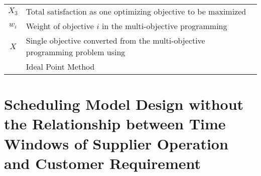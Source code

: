 \documentclass{llncs}
\begin{document}
\begin{center}
\begin{tabular}{c|l}
$X_3$\hspace{1cm} & \hspace{1cm}Total satisfaction as one optimizing objective to be maximized\hspace{4cm}\\
$w_i$\hspace{1cm} & \hspace{1cm}Weight of objective $i$ in the multi-objective programming \hspace{4cm}\\
$X$\hspace{1cm} & \hspace{1cm}Single objective converted from the multi-objective programming problem using \hspace{4cm}\\
\hspace{1cm} & \hspace{1cm}Ideal Point Method \hspace{4cm}\\\hline
\end{tabular}
\end{center}




\section{Scheduling Model Design without the Relationship between Time Windows of
Supplier Operation and Customer Requirement}
\end{document}
